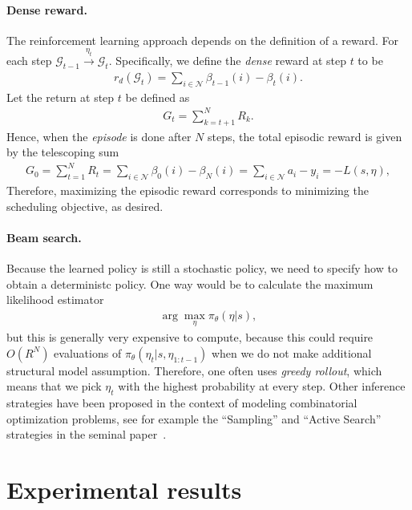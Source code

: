 \documentclass[a4paper]{report}
\theoremstyle{definition}
\theoremstyle{plain}
\begin{document}
\paragraph{Dense reward.}
The reinforcement learning approach depends on the definition of a reward. For
each step $\mathcal{G}_{t-1} \xrightarrow{\eta_{t}} \mathcal{G}_{t}$.
Specifically, we define the \emph{dense} reward at step $t$ to be
\begin{align*}
  r_d(\mathcal{G}_t) = \sum_{i \in \mathcal{N}} \beta_{t-1}(i) - \beta_{t}(i) .
\end{align*}
Let the return at step $t$ be defined as
\begin{align*}
  G_{t} = \sum_{k=t + 1}^{N} R_{k} .
\end{align*}
Hence, when the \textit{episode} is done after $N$ steps, the total episodic
reward is given by the telescoping sum
\begin{align*}
  G_{0} = \sum_{t=1}^{N} R_{t} = \sum_{i \in \mathcal{N}} \beta_{0}(i) - \beta_{N}(i)  = \sum_{i \in \mathcal{N}} a_{i} - y_{i} = - L(s, \eta) ,
\end{align*}
Therefore, maximizing the episodic reward corresponds to minimizing the
scheduling objective, as desired.
%

\paragraph{Beam search.}

Because the learned policy is still a stochastic policy, we need to specify how to obtain a deterministc policy.
%
One way would be to calculate the maximum likelihood estimator
\begin{align*}
  \arg\max_{\eta} \pi_\theta(\eta | s) ,
\end{align*}
but this is generally very expensive to compute, because this could require
$O(R^{N})$ evaluations of $\pi_\theta(\eta_{t} | s, \eta_{1:t-1})$ when we do
not make additional structural model assumption.
%
Therefore, one often uses \textit{greedy rollout}, which means that we pick $\eta_{t}$ with
the highest probability at every step.
Other inference strategies have been proposed in the context of modeling
combinatorial optimization problems, see for example the ``Sampling'' and
``Active Search'' strategies in the seminal
paper~\cite{belloNeuralCombinatorialOptimization2017}.


\clearpage
\section{Experimental results}\label{sec:results}
\end{document}
